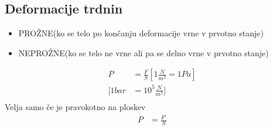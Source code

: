 {\color{indiagreen}\subsection{Deformacije trdnin}}
\begin{itemize}
	\item PROŽNE(ko se telo po končanju deformacije vrne v prvotno stanje)
	\item NEPROŽNE(ko se telo ne vrne ali pa se delno vrne v prvotno stanje)
\end{itemize}
\begin{align*}
	P&=\frac{F}{S} [1\frac{N}{m^2} = 1Pa]\\
	[1bar &= 10^5\frac{N}{m^2}]\\	
\end{align*}
Velja samo če je pravokotno na ploskev
\begin{align*}
	P&=\frac{F'}{S}\\
\end{align*}
